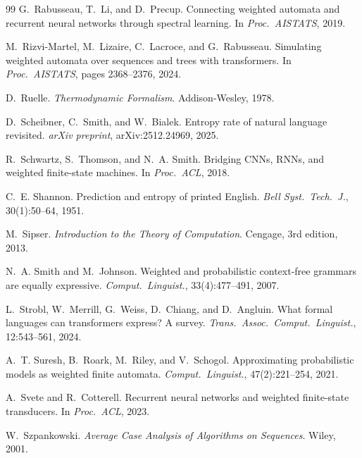 \begin{thebibliography}{99}
G.~Rabusseau, T.~Li, and D.~Precup.
\newblock Connecting weighted automata and recurrent neural networks through spectral learning.
\newblock In \emph{Proc.\ AISTATS}, 2019.

M.~Rizvi-Martel, M.~Lizaire, C.~Lacroce, and G.~Rabusseau.
\newblock Simulating weighted automata over sequences and trees with transformers.
\newblock In \emph{Proc.\ AISTATS}, pages 2368--2376, 2024.

D.~Ruelle.
\newblock \emph{Thermodynamic Formalism}.
\newblock Addison-Wesley, 1978.

D.~Scheibner, C.~Smith, and W.~Bialek.
\newblock Entropy rate of natural language revisited.
\newblock \emph{arXiv preprint}, arXiv:2512.24969, 2025.

R.~Schwartz, S.~Thomson, and N.~A. Smith.
\newblock Bridging {CNN}s, {RNN}s, and weighted finite-state machines.
\newblock In \emph{Proc.\ ACL}, 2018.

C.~E. Shannon.
\newblock Prediction and entropy of printed {E}nglish.
\newblock \emph{Bell Syst.\ Tech.\ J.}, 30(1):50--64, 1951.

M.~Sipser.
\newblock \emph{Introduction to the Theory of Computation}.
\newblock Cengage, 3rd edition, 2013.

N.~A. Smith and M.~Johnson.
\newblock Weighted and probabilistic context-free grammars are equally expressive.
\newblock \emph{Comput.\ Linguist.}, 33(4):477--491, 2007.

L.~Strobl, W.~Merrill, G.~Weiss, D.~Chiang, and D.~Angluin.
\newblock What formal languages can transformers express? {A} survey.
\newblock \emph{Trans.\ Assoc.\ Comput.\ Linguist.}, 12:543--561, 2024.

A.~T. Suresh, B.~Roark, M.~Riley, and V.~Schogol.
\newblock Approximating probabilistic models as weighted finite automata.
\newblock \emph{Comput.\ Linguist.}, 47(2):221--254, 2021.

A.~Svete and R.~Cotterell.
\newblock Recurrent neural networks and weighted finite-state transducers.
\newblock In \emph{Proc.\ ACL}, 2023.

W.~Szpankowski.
\newblock \emph{Average Case Analysis of Algorithms on Sequences}.
\newblock Wiley, 2001.


\end{thebibliography}
